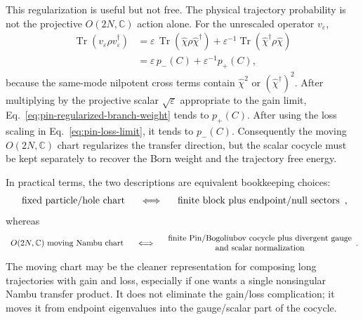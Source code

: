 \documentclass[aps,prb,onecolumn,nofootinbib,superscriptaddress]{revtex4-2}
\newcommand{\Tr}{\operatorname{Tr}}
\theoremstyle{plain}
\theoremstyle{definition}
\begin{document}
This regularization is useful but not free.  The physical trajectory
probability is not the projective \(O(2N,\mathbb C)\) action alone.  For the
unrescaled operator \(v_\varepsilon\),
\begin{align}
  \Tr(v_\varepsilon\rho v_\varepsilon^\dagger)
  &=
  \varepsilon\,\Tr(\hat\chi\rho\hat\chi^\dagger)
  +
  \varepsilon^{-1}\Tr(\hat\chi^\dagger\rho\hat\chi)
  \nonumber\\
  &=
  \varepsilon\,p_-(C)+\varepsilon^{-1}p_+(C),
  \label{eq:pin-regularized-branch-weight}
\end{align}
because the same-mode nilpotent cross terms contain \(\hat\chi^2\) or \((\hat\chi^\dagger)^2\).
After multiplying by the projective scalar \(\sqrt{\varepsilon}\) appropriate
to the gain limit, Eq.~\eqref{eq:pin-regularized-branch-weight} tends to
\(p_+(C)\).  After using the loss scaling in
Eq.~\eqref{eq:pin-loss-limit}, it tends to \(p_-(C)\).  Consequently the
moving \(O(2N,\mathbb C)\) chart regularizes the transfer direction, but the
scalar cocycle must be kept separately to recover the Born weight and the
trajectory free energy.

In practical terms, the two descriptions are equivalent bookkeeping choices:
\begin{equation}
  \begin{array}{c}
  \hbox{fixed particle/hole chart}
  \end{array}
  \quad\Longleftrightarrow\quad
  \begin{array}{c}
  \hbox{finite block plus endpoint/null sectors}
  \end{array},
  \label{eq:fixed-chart-bookkeeping}
\end{equation}
whereas
\begin{equation}
  \begin{array}{c}
  O(2N,\mathbb C)\hbox{ moving Nambu chart}
  \end{array}
  \quad\Longleftrightarrow\quad
  \begin{array}{c}
  \hbox{finite Pin/Bogoliubov cocycle plus divergent gauge}\\
  \hbox{and scalar normalization}
  \end{array}.
  \label{eq:moving-chart-bookkeeping}
\end{equation}
The moving chart may be the cleaner representation for composing long
trajectories with gain and loss, especially if one wants a single nonsingular
Nambu transfer product.  It does not eliminate the gain/loss complication; it
moves it from endpoint eigenvalues into the gauge/scalar part of the cocycle.
\end{document}
